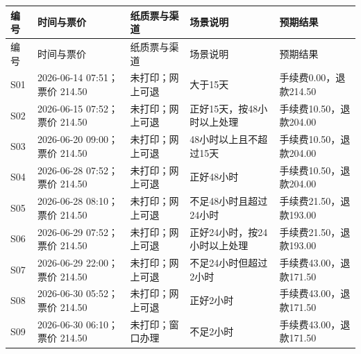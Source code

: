 \documentclass[bwprint]{report}
\begin{document}
{
\setlength{\tabcolsep}{3pt}
\begin{longtable}{P{1.1cm}P{3.05cm}P{2.25cm}P{3.45cm}P{3.05cm}}
\toprule
编号 & 时间与票价 & 纸质票与渠道 & 场景说明 & 预期结果\\
\midrule
\endfirsthead
\toprule
编号 & 时间与票价 & 纸质票与渠道 & 场景说明 & 预期结果\\
\midrule
\endhead
S01 & 2026-\hspace{0pt}06-\hspace{0pt}14 07:51；票价 214.50 & 未打印；网上可退 & 大于15天 & 手续费0.00，退款214.50 \\
S02 & 2026-\hspace{0pt}06-\hspace{0pt}15 07:52；票价 214.50 & 未打印；网上可退 & 正好15天，按48小时以上处理 & 手续费10.50，退款204.00 \\
S03 & 2026-\hspace{0pt}06-\hspace{0pt}20 09:00；票价 214.50 & 未打印；网上可退 & 48小时以上且不超过15天 & 手续费10.50，退款204.00 \\
S04 & 2026-\hspace{0pt}06-\hspace{0pt}28 07:52；票价 214.50 & 未打印；网上可退 & 正好48小时 & 手续费10.50，退款204.00 \\
S05 & 2026-\hspace{0pt}06-\hspace{0pt}28 08:10；票价 214.50 & 未打印；网上可退 & 不足48小时且超过24小时 & 手续费21.50，退款193.00 \\
S06 & 2026-\hspace{0pt}06-\hspace{0pt}29 07:52；票价 214.50 & 未打印；网上可退 & 正好24小时，按24小时以上处理 & 手续费21.50，退款193.00 \\
S07 & 2026-\hspace{0pt}06-\hspace{0pt}29 22:00；票价 214.50 & 未打印；网上可退 & 不足24小时但超过2小时 & 手续费43.00，退款171.50 \\
S08 & 2026-\hspace{0pt}06-\hspace{0pt}30 05:52；票价 214.50 & 未打印；网上可退 & 正好2小时 & 手续费43.00，退款171.50 \\
S09 & 2026-\hspace{0pt}06-\hspace{0pt}30 06:10；票价 214.50 & 未打印；窗口办理 & 不足2小时 & 手续费43.00，退款171.50 \\

\end{longtable}}
\end{document}
